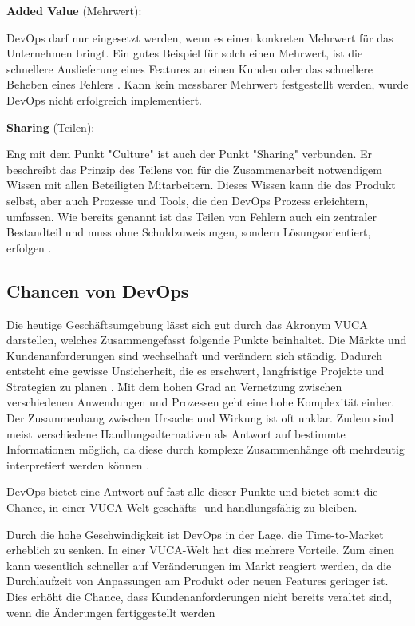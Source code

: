 \textbf{Added Value} (Mehrwert):

DevOps darf nur eingesetzt werden, wenn es einen konkreten Mehrwert für das Unternehmen
bringt. Ein gutes Beispiel für solch einen Mehrwert, ist die schnellere Auslieferung
eines Features an einen Kunden oder das schnellere Beheben eines Fehlers \cite{Halstenberg2020}.
Kann kein messbarer Mehrwert festgestellt werden, wurde DevOps nicht erfolgreich implementiert.


\textbf{Sharing} (Teilen):

Eng mit dem Punkt "Culture" ist auch der Punkt "Sharing" verbunden.
Er beschreibt das Prinzip des Teilens von für die Zusammenarbeit notwendigem Wissen
mit allen Beteiligten Mitarbeitern. Dieses Wissen kann die das Produkt selbst,
aber auch Prozesse und Tools, die den DevOps Prozess erleichtern, umfassen.
Wie bereits genannt ist das Teilen von Fehlern auch ein zentraler Bestandteil und
muss ohne Schuldzuweisungen, sondern Lösungsorientiert, erfolgen \cite{Halstenberg2020}.

\subsection{Chancen von DevOps}

Die heutige Geschäftsumgebung lässt sich gut durch das Akronym \ac{VUCA} darstellen,
welches Zusammengefasst folgende Punkte beinhaltet.
Die Märkte und Kundenanforderungen sind wechselhaft und verändern sich ständig.
Dadurch entsteht eine gewisse Unsicherheit, die es erschwert, langfristige Projekte
und Strategien zu planen \cite{Halstenberg2020}.
Mit dem hohen Grad an Vernetzung zwischen verschiedenen Anwendungen und Prozessen
geht eine hohe Komplexität einher. Der Zusammenhang zwischen Ursache und Wirkung
ist oft unklar. Zudem sind meist verschiedene Handlungsalternativen als Antwort
auf bestimmte Informationen möglich, da diese durch komplexe Zusammenhänge
oft mehrdeutig interpretiert werden können \cite{Halstenberg2020}.

DevOps bietet eine Antwort auf fast alle dieser Punkte und bietet somit die Chance,
in einer VUCA-Welt geschäfts- und handlungsfähig zu bleiben.

Durch die hohe Geschwindigkeit ist DevOps in der Lage, die Time-to-Market erheblich
zu senken. In einer VUCA-Welt hat dies mehrere Vorteile.
Zum einen kann wesentlich schneller auf Veränderungen im Markt reagiert werden,
da die Durchlaufzeit von Anpassungen am Produkt oder neuen Features geringer ist.
Dies erhöht die Chance, dass Kundenanforderungen nicht bereits veraltet sind,
wenn die Änderungen fertiggestellt werden \cite{Halstenberg2020}

